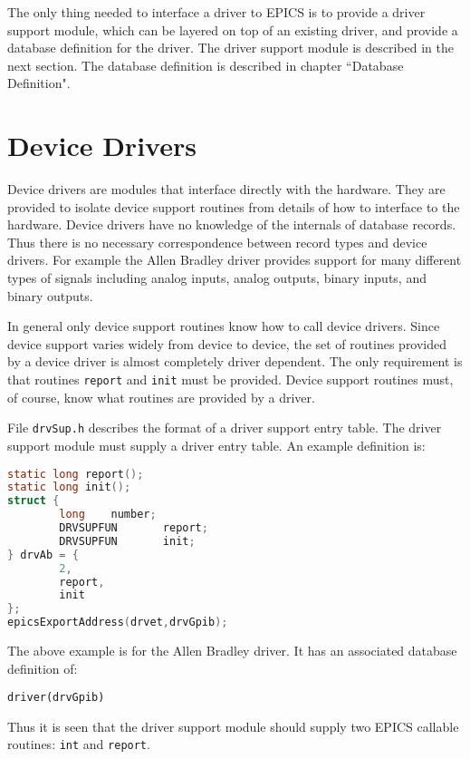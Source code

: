 The only thing needed to interface a driver to EPICS is to provide a driver support module, which can be layered on top of 
an existing driver, and provide a database definition for the driver. The driver support module is described in the next 
section. The database definition is described in chapter ``Database Definition".

\section{Device Drivers}

Device drivers are modules that interface directly with the hardware. They are provided to isolate device support routines 
from details of how to interface to the hardware. Device drivers have no knowledge of the internals of database records. 
Thus there is no necessary correspondence between record types and device drivers. For example the Allen Bradley driver 
provides support for many different types of signals including analog inputs, analog outputs, binary inputs, and binary 
outputs. 

In general only device support routines know how to call device drivers. Since device support varies widely from device 
to device, the set of routines provided by a device driver is almost completely driver dependent. The only requirement is 
that routines \verb|report| and \verb|init| must be provided. Device support routines must, of course, know what routines are 
provided by a driver.

File \verb|drvSup.h| describes the format of a driver support entry table. The driver support module must supply a driver entry 
table. An example definition is:

\begin{lstlisting}[language=C]
static long report();
static long init();
struct {
        long    number;
        DRVSUPFUN       report;
        DRVSUPFUN       init;
} drvAb = {
        2,
        report,
        init
};
epicsExportAddress(drvet,drvGpib);
\end{lstlisting}

The above example is for the Allen Bradley driver. It has an associated database definition of:

\begin{verbatim}
driver(drvGpib)
\end{verbatim}

Thus it is seen that the driver support module should supply two EPICS callable routines: \verb|int| and \verb|report|.

